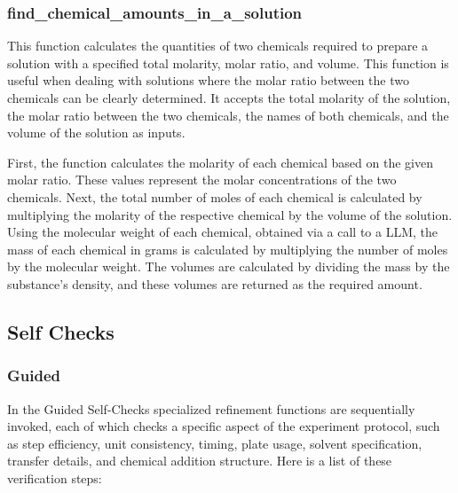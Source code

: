 \documentclass[sn-nature, twocolumn]{sn-jnl}%
\theoremstyle{thmstyleone}%
\theoremstyle{thmstyletwo}%
\theoremstyle{thmstylethree}%
\begin{document}
\subsubsection*{find\_chemical\_amounts\_in\_a\_solution} 


This function calculates the quantities of two chemicals required to prepare a solution with a specified total molarity, molar ratio, and volume. This function is useful when dealing with solutions where the molar ratio between the two chemicals can be clearly determined. It accepts the total molarity of the solution, the molar ratio between the two chemicals, the names of both chemicals, and the volume of the solution as inputs. 

First, the function calculates the molarity of each chemical based on the given molar ratio. These values represent the molar concentrations of the two chemicals. Next, the total number of moles of each chemical is calculated by multiplying the molarity of the respective chemical by the volume of the solution. Using the molecular weight of each chemical, obtained via a call to a LLM, the mass of each chemical in grams is calculated by multiplying the number of moles by the molecular weight. The volumes are calculated by dividing the mass by the substance's density, and these volumes are returned as the required amount.



\subsection{Self Checks}

\subsubsection*{Guided}
In the Guided Self-Checks specialized refinement functions are sequentially invoked, each of which checks a specific aspect of the experiment protocol, such as step efficiency, unit consistency, timing, plate usage, solvent specification, transfer details, and chemical addition structure. Here is a list of these verification steps:
\end{document}
